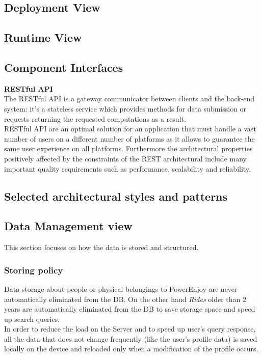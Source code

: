 \subsection{Deployment View}

\subsection{Runtime View}
\newpage
\subsection{Component Interfaces}
\label{sec:CInter}

\textbf{RESTful API}\\The RESTful API is a gateway communicator between clients and the back-end system: it's a stateless service which provides methods for data submission or requests returning the requested computations as a result.\\
RESTful API are an optimal solution for an application that must handle a vast number of users on a different number of platforms as it allows to guarantee the same user experience on all platforms. Furthermore the architectural properties positively affected by the constraints of the REST architectural include many important quality requirements such as performance, scalability and reliability.
\newpage
\subsection{Selected architectural styles and patterns}
\newpage

\subsection{Data Management view}
\label{sec:DMV}
This section focuses on how the data is stored and structured.
\subsubsection{Storing policy}
Data storage about people or physical belongings to PowerEnjoy are never automatically eliminated from the DB. On the other hand \emph{Rides} older than 2 years are automatically eliminated from the DB to save storage space and 
speed up search queries.\\
In order to reduce the load on the Server and to speed up user’s query
response, all the data that does not change frequently (like the user’s profile
data) is saved locally on the device and reloaded only when a modification
of the profile occurs.

